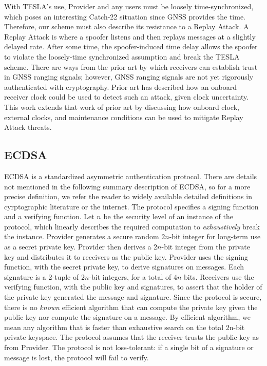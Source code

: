 \documentclass[letterpaper,times]{IONconf/IONconf}
\begin{document}
With TESLA's use, Provider and any users must be loosely time-synchronized, which poses an interesting Catch-22 situation since GNSS provides the time.
Therefore, our scheme must also describe its resistance to a Replay Attack.
A Replay Attack is where a spoofer listens and then replays messages at a slightly delayed rate.
After some time, the spoofer-induced time delay allows the spoofer to violate the loosely-time synchronized assumption and break the TESLA scheme.
There are ways from the prior art by which receivers can establish trust in GNSS ranging signals\cite{Psiaki2016,Fernandez-Hernandez2018}; however, GNSS ranging signals are not yet rigorously authenticated with cryptography.
Prior art has described how an onboard receiver clock could be used to detect such an attack, given clock uncertainty\cite{time_sync_paper}.
This work extends that work of prior art by discussing how onboard clock, external clocks, and maintenance conditions can be used to mitigate Replay Attack threats.

\subsection{ECDSA}
ECDSA is a standardized asymmetric authentication protocol.
There are details not mentioned in the following summary description of ECDSA, so for a more precise definition, we refer the reader to widely available detailed definitions in cyrptographic literature or the internet.
The protocol specifies a signing function and a verifying function.
Let $n$ be the security level of an instance of the protocol, which linearly describes the required computation to {\em exhaustively} break the instance.
Provider generates a secure random $2n$-bit integer for long-term use as a secret private key.
Provider then derives a $2n$-bit integer from the private key and distributes it to receivers as the public key.
Provider uses the signing function, with the secret private key, to derive signatures on messages.
Each signature is a 2-tuple of $2n$-bit integers, for a total of $4n$ bits.
Receivers use the verifying function, with the public key and signatures, to assert that the holder of the private key generated the message and signature.
Since the protocol is secure, there is no {\em known} efficient algorithm that can compute the private key given the public key nor compute the signature on a message.
By efficient algorithm, we mean any algorithm that is faster than exhaustive search on the total 2n-bit private keyspace.
The protocol assumes that the receiver trusts the public key as from Provider.
The protocol is not loss-tolerant: if a single bit of a signature or message is lost, the protocol will fail to verify.
\end{document}
